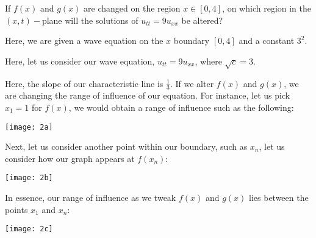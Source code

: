 \item If $f(x)$ and $g(x)$ are changed on the region $x \in [0, 4]$, on which region in the $(x, t)-$plane will the solutions of $u_{tt} = 9u_{xx}$ be altered?

Here, we are given a wave equation on the $x$ boundary $[0, 4]$ and a constant $3^2$.

Here, let us consider our wave equation, $u_{tt} = 9u_{xx}$, where $\sqrt{c} = 3$.

Here, the slope of our characteristic line is $\frac{1}{3}$. If we alter $f(x)$ and $g(x)$, we are changing the range of influence of our equation. For instance, let us pick $x_1 = 1$ for $f(x)$, we would obtain a range of influence such as the following:
%
\begin{center}
  \texttt{[image: 2a]}
\end{center}

Next, let us consider another point within our boundary, such as $x_n$, let us consider how our graph appears at $f(x_n)$:
%
\begin{center}
  \texttt{[image: 2b]}
\end{center}

In essence, our range of influence as we tweak $f(x)$ and $g(x)$ lies between the points $x_1$ and $x_n$:
%
\begin{center}
  \texttt{[image: 2c]}
\end{center}
